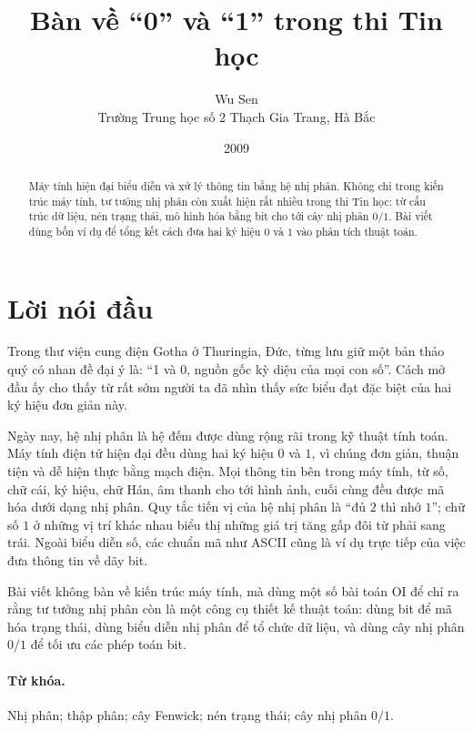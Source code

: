 \documentclass[11pt]{article}
\title{Bàn về ``0'' và ``1'' trong thi Tin học}
\author{Wu Sen\\Trường Trung học số 2 Thạch Gia Trang, Hà Bắc}
\date{2009}
\begin{document}
\maketitle


\begin{abstract}
Máy tính hiện đại biểu diễn và xử lý thông tin bằng hệ nhị phân. Không chỉ
trong kiến trúc máy tính, tư tưởng nhị phân còn xuất hiện rất nhiều trong
thi Tin học: từ cấu trúc dữ liệu, nén trạng thái, mô hình hóa bằng bit cho
tới cây nhị phân \(0/1\). Bài viết dùng bốn ví dụ để tổng kết cách đưa hai
ký hiệu \(0\) và \(1\) vào phân tích thuật toán.
\end{abstract}

\section*{Lời nói đầu}

Trong thư viện cung điện Gotha ở Thuringia, Đức, từng lưu giữ một bản thảo
quý có nhan đề đại ý là: ``1 và 0, nguồn gốc kỳ diệu của mọi con số''. Cách
mở đầu ấy cho thấy từ rất sớm người ta đã nhìn thấy sức biểu đạt đặc biệt của
hai ký hiệu đơn giản này.

Ngày nay, hệ nhị phân là hệ đếm được dùng rộng rãi trong kỹ thuật tính toán.
Máy tính điện tử hiện đại đều dùng hai ký hiệu \(0\) và \(1\), vì chúng đơn
giản, thuận tiện và dễ hiện thực bằng mạch điện. Mọi thông tin bên trong máy
tính, từ số, chữ cái, ký hiệu, chữ Hán, âm thanh cho tới hình ảnh, cuối cùng
đều được mã hóa dưới dạng nhị phân. Quy tắc tiến vị của hệ nhị phân là
``đủ \(2\) thì nhớ \(1\)''; chữ số \(1\) ở những vị trí khác nhau biểu thị
những giá trị tăng gấp đôi từ phải sang trái. Ngoài biểu diễn số, các chuẩn
mã như ASCII cũng là ví dụ trực tiếp của việc đưa thông tin về dãy bit.

Bài viết không bàn về kiến trúc máy tính, mà dùng một số bài toán OI để chỉ ra
rằng tư tưởng nhị phân còn là một công cụ thiết kế thuật toán: dùng bit để
mã hóa trạng thái, dùng biểu diễn nhị phân để tổ chức dữ liệu, và dùng cây
nhị phân \(0/1\) để tối ưu các phép toán bit.

\paragraph{Từ khóa.}
Nhị phân; thập phân; cây Fenwick; nén trạng thái; cây nhị phân \(0/1\).
\end{document}
